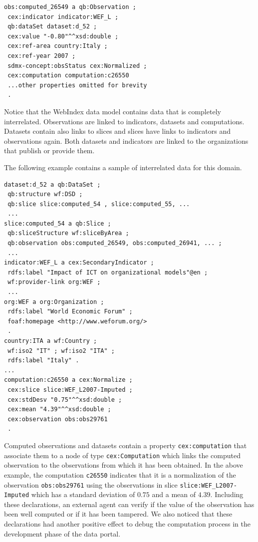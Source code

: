 \documentclass{llncs}
\begin{document}
\begin{lstlisting}[style=SPARQL]
obs:computed_26549 a qb:Observation ;
 cex:indicator indicator:WEF_L ;
 qb:dataSet dataset:d_52 ;
 cex:value "-0.80"^^xsd:double ;
 cex:ref-area country:Italy ;
 cex:ref-year 2007 ;
 sdmx-concept:obsStatus cex:Normalized ;
 cex:computation computation:c26550
 ...other properties omitted for brevity
 .
\end{lstlisting}

Notice that the WebIndex data model contains data that is completely interrelated. Observations are linked to indicators, datasets and computations. Datasets contain also links to slices and slices have links to indicators and observations again. 
Both datasets and indicators are linked to the organizations that publish or provide them. 

The following example contains a sample of interrelated 
data for this domain. 
 
\begin{lstlisting}[style=SPARQL]
dataset:d_52 a qb:DataSet ;
 qb:structure wf:DSD ;
 qb:slice slice:computed_54 , slice:computed_55, ...
 ...
slice:computed_54 a qb:Slice ;
 qb:sliceStructure wf:sliceByArea ;
 qb:observation obs:computed_26549, obs:computed_26941, ... ;
 ...
indicator:WEF_L a cex:SecondaryIndicator ;
 rdfs:label "Impact of ICT on organizational models"@en ;
 wf:provider-link org:WEF ;
 ...
org:WEF a org:Organization ;
 rdfs:label "World Economic Forum" ;
 foaf:homepage <http://www.weforum.org/> 
 .
country:ITA a wf:Country ;
 wf:iso2 "IT" ; wf:iso2 "ITA" ;
 rdfs:label "Italy" .
...
computation:c26550 a cex:Normalize ;
 cex:slice slice:WEF_L2007-Imputed ;
 cex:stdDesv "0.75"^^xsd:double ;
 cex:mean "4.39"^^xsd:double ;
 cex:observation obs:obs29761 
 .
\end{lstlisting}

Computed observations and datasets contain a property \lstinline|cex:computation| that associate them to a node of type \lstinline|cex:Computation| which links the computed observation to the observations
from which it has been obtained. In the above example, the computation \lstinline|c26550| indicates that it is a normalization of the observation \lstinline|obs:obs29761| using the observations
in slice \lstinline|slice:WEF_L2007-Imputed| which has a standard deviation of $0.75$ and a mean of $4.39$. 
Including these declarations, an external agent can verify if the value of the observation has been well computed or if it has been tampered. We also noticed that these declarations had another positive effect to debug the computation process in the development phase of the data portal.
\end{document}
